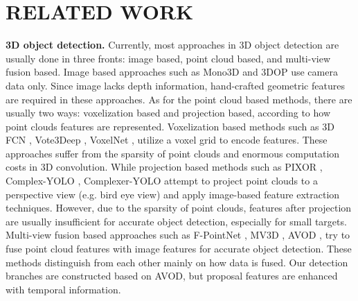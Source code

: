 \documentclass[a4paper, 10pt, conference]{ieeeconf}      %
\begin{document}
\section{RELATED WORK}

\textbf{3D object detection.} Currently, most approaches in 3D object detection are usually done in three fronts: image based, point cloud based, and multi-view fusion based. Image based approaches such as Mono3D \cite{7780605} and 3DOP \cite{chen20183d} use camera data only. Since image lacks depth information, hand-crafted geometric features are required in these approaches. As for the point cloud based methods, there are usually two ways: voxelization based and projection based, according to how point clouds features are represented. Voxelization based methods such as 3D FCN \cite{li20173d}, Vote3Deep \cite{engelcke2017vote3deep}, VoxelNet \cite{zhou2018voxelnet}, utilize a voxel grid to encode features. These approaches suffer from the sparsity of point clouds and enormous computation costs in 3D convolution. While projection based methods such as PIXOR \cite{yang2018pixor}, Complex-YOLO \cite{simon2018complex}, Complexer-YOLO \cite{Simon_2019_CVPR_Workshops} attempt to project point clouds to a perspective view (e.g. bird eye view) and apply image-based feature extraction techniques. However, due to the sparsity of point clouds, features after projection are usually insufficient for accurate object detection, especially for small targets. Multi-view fusion based approaches such as F-PointNet \cite{qi2018frustum}, MV3D \cite{chen2017multi}, AVOD \cite{ku2018joint}, try to fuse point cloud features with image features for accurate object detection. These methods distinguish from each other mainly on how data is fused. Our detection branches are constructed based on AVOD, but proposal features are enhanced with temporal information.

\end{document}
